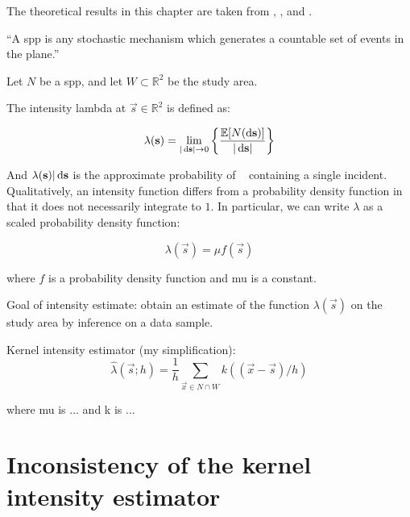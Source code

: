 


The theoretical results in this chapter are taken from \citet{diggle1988equivalence}, \citet{guan2008consistent}, and \citet{wand1994kernel}.

\begin{defn}
``A \gls{spp} is any stochastic mechanism which generates a countable set of events in the plane.''
\end{defn}

Let \(N\) be a \gls{spp}, and let \(W \subset \mathbb{R}^2 \) be the study area.

The intensity \gls{lambda} at \(\vec{s} \in \mathbb{R}^2\) is defined as:

\begin{equation}
\label{eq:lambda_differential}
    \lambda (\vec{s}) = \lim_{|\ds| \to 0}
        \left\{
            \frac{\mathbb{E}[N(\ds)]}%
            {|\ds|}
        \right\}
\end{equation}

And \(\lambda(\mathbf{s})|\mathop{}\!\mathrm{d}{\mathbf{s}}\) is the approximate probability of \ds~ containing a single incident.
Qualitatively, an intensity function differs from a probability density function in that it does not necessarily integrate to \(1\).
In particular, we can write \(\lambda\) as a scaled probability density function:

\begin{equation}
\label{eq:lambda_mu}
    \lambda(\vec{s}) = \mu f(\vec{s})
\end{equation}

where \(f\) is a probability density function and \gls{mu} is a constant.

Goal of intensity estimate: obtain an estimate of the function \(\lambda(\vec{s})\) on the study area by inference on a data sample.

Kernel intensity estimator (my simplification):
\begin{equation}
\label{eq:lambda_hat}
    \hat{\lambda}(\vec{s}; h) = \frac{1}{h} \sum_{\vec{x} \in N \cap W}{k((\vec{x}-\vec{s})/h)}
\end{equation}

where \gls{mu} is ... and \gls{k} is ...

%
%
\section{Inconsistency of the kernel intensity estimator}

